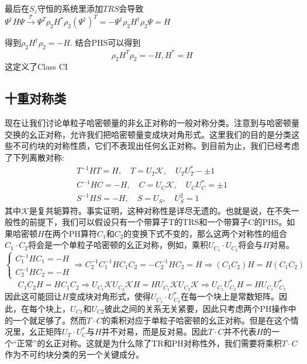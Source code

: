 \documentclass[a4paper]{article}
\numberwithin{equation}{subsection}
\newcommand{\mT}{\mathcal{T}}
\begin{document}
最后在$S_z$守恒的系统里添加$TRS$会导致$\Psi^\dagger H\Psi\xrightarrow{\mT}\Psi^T\rho_2H^*\rho_2(\Psi^\dagger)^T=-\Psi^\dagger\rho_2 H^\dagger\rho_2\Psi=H$

得到$\rho_2H^\dagger\rho_2=-H$. 结合PHS可以得到
\begin{equation}
    \rho_2 H^T\rho_2=-H,H^*=H
\end{equation}
这定义了Class CI
\subsection{十重对称类}
现在让我们讨论单粒子哈密顿量的非幺正对称的一般对称分类。注意到与哈密顿量交换的幺正对称，允许我们把哈密顿量变成块对角形式。这里我们的目的是分类这些不可约块的对称性质，它们不表现出任何幺正对称。到目前为止，我们已经考虑了下列离散对称: 
\begin{equation}
    \begin{split}
        T^{-1}HT=H,\quad T=U_T\mathcal{K},\quad U_TU_T^*-\pm 1\\
        C^{-1}HC=-H,\quad C=U_C\mathcal{K},\quad U_CU_C^*=\pm 1\\
        S^{-1}HS=-H,\quad S=U_S,\quad U_S^2=1
    \end{split}
\end{equation}
其中$\mathcal{K}$是复共轭算符。事实证明，这种对称性是详尽无遗的。也就是说，在不失一般性的前提下，我们可以假设只有一个带算子T的TRS和一个带算子C的PHS。如果哈密顿$H$在两个PH算符$C_1$和$C_2$的变换下式不变的，那么这两个对称性的组合$C_1\cdot C_2$将会是一个单粒子哈密顿的幺正对称，例如，乘积$U_{C_1}\cdot U_{C_2}$将会与$H$对易。
\begin{equation}
    \begin{cases}
        C_1^{-1}HC_1=-H\\
        C_2^{-1}HC_2=-H
    \end{cases}\Rightarrow C_2^{-1}C_1^{-1}HC_1C_2=-C_2^{-1}HC_2=H\Rightarrow (C_1C_2)H=H(C_1C_2)
\end{equation}
\begin{equation}
    C_1C_2H=HC_1C_2\Rightarrow U_{C_1}\mathcal{K}U_{C_2}\mathcal{K}H=HU_{C_1}\mathcal{K}U_{C_2}\mathcal{K}\Rightarrow U_{C_1}U_{C_2}^*H=HU_{C_1}U_{C_2}^*
\end{equation}
因此这可能回让$H$变成块对角形式，使得$U_{C_1}\cdot U_{C_2}^*$在每一个块上是常数矩阵。因此，在每个块上，$U_{C1}$和$U_{C2}$彼此之间的关系无关紧要，因此只考虑两个PH操作中的一个就足够了。然而$T\cdot C$的乘积对应于单粒子哈密顿的幺正对称。但是在这个情况里，幺正矩阵$U_T\cdot U_C^*$与$H$并不对易，而是反对易。因此$T\cdot C$并不代表$H$的一个“正常”的幺正对称。这就是为什么除了TR和PH对称性外，我们需要将乘积$T\cdot C$作为不可约块分类的另一个关键成分。
\end{document}
